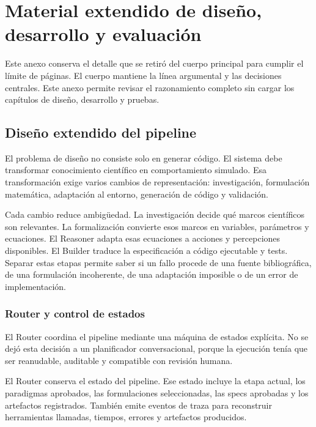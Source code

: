 \chapter[Material extendido]{Material extendido de diseño, desarrollo y evaluación}
\label{ap:material-extendido}

Este anexo conserva el detalle que se retiró del cuerpo principal para cumplir
el límite de páginas. El cuerpo mantiene la línea argumental y las decisiones
centrales. Este anexo permite revisar el razonamiento completo sin cargar los
capítulos de diseño, desarrollo y pruebas.

\section{Diseño extendido del pipeline}
\label{ap:diseno-extendido}

El problema de diseño no consiste solo en generar código. El sistema debe
transformar conocimiento científico en comportamiento simulado. Esa
transformación exige varios cambios de representación: investigación,
formulación matemática, adaptación al entorno, generación de código y
validación.

Cada cambio reduce ambigüedad. La investigación decide qué marcos científicos
son relevantes. La formalización convierte esos marcos en variables, parámetros
y ecuaciones. El Reasoner adapta esas ecuaciones a acciones y percepciones
disponibles. El Builder traduce la especificación a código ejecutable y tests.
Separar estas etapas permite saber si un fallo procede de una fuente
bibliográfica, de una formulación incoherente, de una adaptación imposible o de
un error de implementación.

\subsection{Router y control de estados}

El Router coordina el pipeline mediante una máquina de estados explícita. No se
dejó esta decisión a un planificador conversacional, porque la ejecución tenía
que ser reanudable, auditable y compatible con revisión humana.

El Router conserva el estado del pipeline. Ese estado incluye la etapa actual,
los paradigmas aprobados, las formulaciones seleccionadas, las specs aprobadas
y los artefactos registrados. También emite eventos de traza para reconstruir
herramientas llamadas, tiempos, errores y artefactos producidos.

